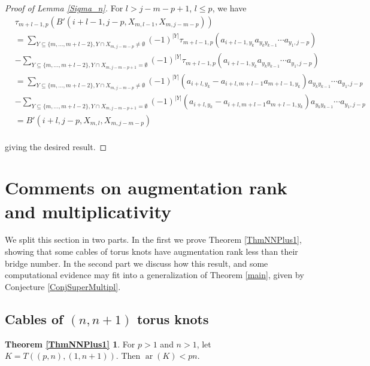 \documentclass[11pt]{amsart}
\def\ar{\operatorname{ar}}
\theoremstyle{definition}
\begin{document}
\begin{proof} [Proof of Lemma \ref{Sigma_n}]
For $l > j-m-p + 1$, $l\le p$, we have
\begin{align*}
&\tau_{m + l - 1,p}( B'(i+l-1,j-p,X_{m,l-1},X_{m,j-m-p}))\\
&= \sum_{Y\subseteq \{m,\ldots,m+l-2\},Y\cap X_{m,j-m-p}\ne\emptyset}(-1)^{|Y|}\tau_{m + l - 1,p}(a_{i+l-1,y_k}a_{y_ky_{k-1}}\cdots a_{y_1,j-p})\\
& - \sum_{Y\subseteq \{m,\ldots,m+l-2\},Y\cap X_{m,j-m-p+1}=\emptyset}(-1)^{|Y|}\tau_{m + l - 1,p}(a_{i+l-1,y_k}a_{y_ky_{k-1}}\cdots a_{y_1,j-p})\\
&= \sum_{Y\subseteq \{m,\ldots,m+l-2\},Y\cap X_{m,j-m-p}\ne\emptyset}(-1)^{|Y|}(a_{i+l,y_k} - a_{i+l,m+l-1}a_{m+l-1,y_k})a_{y_ky_{k-1}}\cdots a_{y_1,j-p}\\
& - \sum_{Y\subseteq \{m,\ldots,m+l-2\},Y\cap X_{m,j-m-p+1}=\emptyset}(-1)^{|Y|}(a_{i+l,y_k} - a_{i+l,m+l-1}a_{m+l-1,y_k})a_{y_ky_{k-1}}\cdots a_{y_1,j-p}\\
&= B'(i+l,j-p,X_{m,l},X_{m,j-m-p})\\
\end{align*}

giving the desired result.
\end{proof}

\section{Comments on augmentation rank and multiplicativity}
\label{SecComments}

We split this section in two parts. In the first we prove Theorem \ref{ThmNNPlus1}, showing that some cables of torus knots have augmentation rank less than their bridge number. In the second part we discuss how this result, and some computational evidence may fit into a generalization of Theorem \ref{main}, given by Conjecture \ref{ConjSuperMultipl}.

\subsection{Cables of $(n,n+1)$ torus knots}
\label{SecNNPlus1}

\newtheorem*{ThmNNPlus1}{Theorem \ref{ThmNNPlus1}}
\begin{ThmNNPlus1}For $p>1$ and $n>1$, let $K=T((p,n),(1,n+1))$. Then $\ar(K) < pn$.
\end{ThmNNPlus1}
\end{document}

